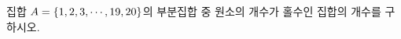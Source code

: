 집합 $A=\{1{,}\mkern3mu\mathopen{}2{,}\mkern3mu\mathopen{}3{,}\mkern3mu\mathopen{}\cdots{,}\mkern3mu\mathopen{}19{,}\mkern3mu\mathopen{}20\}$의 부분집합 중 원소의 개수가 홀수인 집합의 개수를 구하시오.
